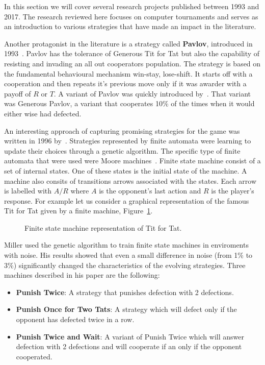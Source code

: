 \documentclass{article}
\theoremstyle{definition}
\begin{document}
In this section we will cover several
research projects published between 1993 and 2017. The research reviewed here focuses
on computer tournaments and serves as an introduction to various strategies that
have made an impact in the literature.

Another protagonist in the literature is a strategy called \textbf{Pavlov},
introduced in 1993~\cite{Nowak1993}. Pavlov has the tolerance of Generous Tit for Tat
but also the capability of resisting and invading an all out cooperators population.
The strategy is based on the fundamental behavioural mechanism win-stay,
lose-shift. It starts off with a cooperation and then repeats it's previous move
only if it was awarder with a payoff of \(R\) or \(T\). A variant of Pavlov
was quickly introduced by~\cite{Wu1995}. That variant was Generous Pavlov, a variant
that cooperates 10\% of the times when it would either wise had defected.

An interesting approach of capturing promising strategies for the game
was written in 1996 by~\cite{Miller1996}. Strategies represented by finite automata
were learning to update their choices through a genetic algorithm.
The specific type of finite automata that were used were Moore machines~\cite{moore1956}.
Finite state machine consist of a set of internal states. One of these states
is the initial state of the machine. A machine also consits of transitions
arrows associated with the states. Each arrow is labelled with \(A/R\) where
\(A\) is the opponent’s last action and \(R\) is the player’s response.
For example let us consider a graphical representation of the famous Tit for Tat
given by a finite machine, Figure~\ref{fig:tit_for_tat_fsm}.

\begin{figure}[!hbtp]
    \centering
    
    \caption{Finite state machine representation of Tit for Tat.}
    \label{fig:tit_for_tat_fsm}
\end{figure}

Miller used the genetic algorithm to train finite state machines in
enviroments with noise. His results showed that even a small difference in noise
(from 1\% to 3\%) significantly changed the characteristics of the
evolving strategies. Three machines described in his paper are the following:

\begin{itemize}
    \item \textbf{Punish Twice}: A strategy that punishes defection with 2 defections.
    \item \textbf{Punish Once for Two Tats}: A strategy which will defect only if the
    opponent has defected twice in a row.
    \item \textbf{Punish Twice and Wait}: A variant of Punish Twice which will
    answer defection with 2 defections and will cooperate if an only if the opponent
    cooperated.
\end{itemize}
\end{document}
